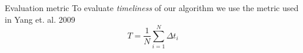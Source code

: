 \documentclass[compress]{beamer}
\begin{document}



\begin{frame}{Evaluation metric}
To evaluate \emph{timeliness} of our algorithm we use the metric used in Yang et. al. 2009
\[T = \frac{1}{N} \sum^{N}_{i=1}\Delta t_i\]
\end{frame}
\end{document}
